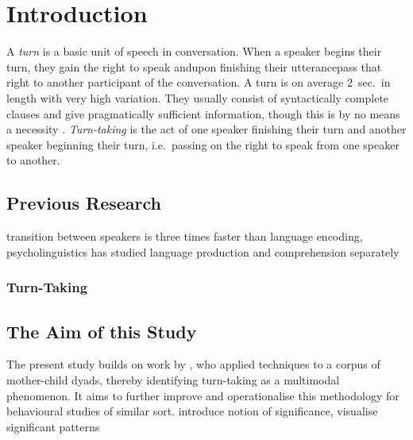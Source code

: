 
\chapter{Introduction}
A \emph{turn} is a basic unit of speech in conversation. When a speaker begins their turn, they gain the right to speak and\dash upon finishing their utterance\dash pass that right to another participant of the conversation. A turn is on average 2~sec.\ in length with very high variation. They usually consist of syntactically complete clauses and give pragmatically sufficient information, though this is by no means a necessity \citep[]{levinson16}. \emph{Turn-taking} is the act of one speaker finishing their turn and another speaker beginning their turn, i.e.\ passing on the right to speak from one speaker to another.

\section{Previous Research}
\citep{levinson16} transition between speakers is three times faster than language encoding, psycholinguistics has studied language production and comprehension separately

\subsection{Turn-Taking}

\subsection{\fpm}



\section{The Aim of this Study}
The present study builds on work by \citet{rohlfing18}, who applied \fpm{} techniques to a corpus of mother-child dyads, thereby identifying turn-taking as a multimodal phenomenon. It aims to further improve and operationalise this methodology for behavioural studies of similar sort.
introduce notion of significance, visualise significant patterns


























